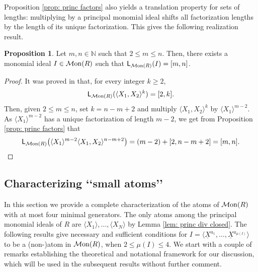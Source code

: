 \documentclass[a4paper,10pt,reqno]{amsart}
\theoremstyle{definition}
\newtheorem{proposition}[theorem]{Proposition}
\theoremstyle{definition}
\providecommand\Mon{{\mathcal{M}{\rm on}}}
\begin{document}
Proposition \ref{prop: princ factors} also yields a translation property for sets of lengths: multiplying by a principal monomial ideal shifts all factorization lengths by the length of its unique factorization. This gives the following realization result.

\begin{proposition}\label{prop: relization of SOL}
  Let $m,n\in \mathbb N$ such that $2\le m\le n$. Then, there exists a monomial ideal $I\in \Mon(R)$ such that $\mathsf L_{\Mon(R)}(I)=[m,n]$.
\end{proposition}
\begin{proof}
It was proved in \cite[Theorem 4.7(3)]{BCK} that, for every integer $k\ge 2$,
\[ \mathsf L_{\Mon(R)}(\langle X_1,X_2\rangle^k)=[2,k].\]
Then, given \(2\le m\le n\), set $k=n-m+2$ and multiply $\langle X_1,X_2\rangle^k$ by $\langle X_1\rangle^{m-2}$. As $\langle X_1\rangle^{m-2}$ has a unique factorization of length $m-2$, we get from Proposition \ref{prop: princ factors} that
\[ \mathsf L_{\Mon(R)} \bigl(\langle X_1\rangle^{m-2}\langle X_1,X_2\rangle^{n-m+2}\bigr) = (m-2)+[2,n-m+2] = [m,n].\]
\end{proof}

\subsection{Characterizing \lq\lq small atoms\rq\rq}\label{char atom mu le 4}
In this section we provide a complete characterization of the atoms of $\Mon(R)$ with at most four minimal generators. The only atoms among the principal monomial ideals of $R$ are $\langle X_1\rangle, \dots, \langle X_N\rangle$ by Lemma \ref{lem: princ div closed}. The following results give necessary and sufficient conditions for $I=\langle\underline X^{a_1},\dots,\underline X^{a_{\mu(I)}}\rangle$ to be a (non-)atom in $\Mon(R)$, when $2\le \mu(I)\le 4$. We start with a couple of remarks establishing the theoretical and notational framework for our discussion, which will be used in the subsequent results without further comment.
\end{document}

